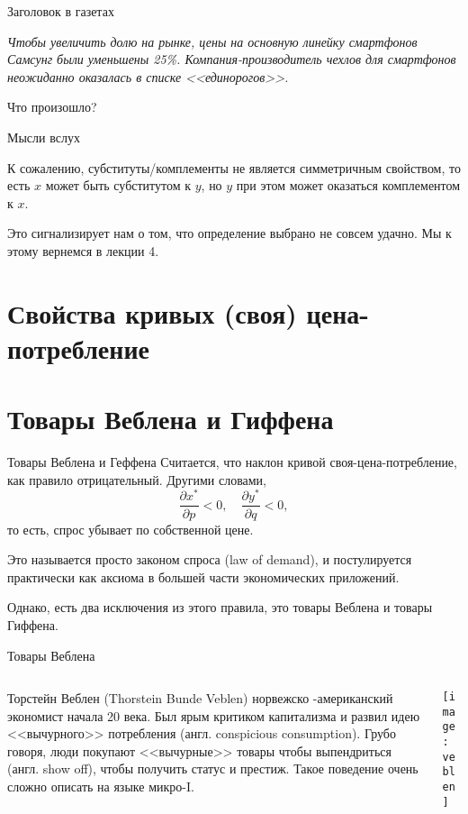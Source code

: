 \documentclass{beamer}
\begin{document}
\begin{frame}{Заголовок в газетах}

\textit{Чтобы увеличить долю на рынке, цены на основную линейку смартфонов Самсунг были уменьшены 25\%. Компания-производитель чехлов для смартфонов неожиданно оказалась в списке <<единорогов>>.}

Что произошло?

\end{frame}

\begin{frame}{Мысли вслух}

К сожалению, субституты/комплементы не является симметричным свойством, то есть $x$ может быть субститутом к $y$, но $y$ при этом может оказаться комплементом к $x$. 

Это сигнализирует нам о том, что определение выбрано не совсем удачно. Мы к этому вернемся в лекции 4.

\end{frame}

\section{Свойства кривых (своя) цена-потребление}
\section{Товары Веблена и Гиффена}

\begin{frame}{Товары Веблена и Геффена}
Считается, что наклон кривой своя-цена-потребление, как правило отрицательный. Другими словами, $$\frac{\partial x^*}{\partial p} <0, \quad \frac{\partial y^*}{\partial q} <0,$$
то есть, спрос убывает по собственной цене. 

Это называется просто \alert{законом спроса} (law of demand), и постулируется практически как аксиома в большей части экономических приложений.

Однако, есть два исключения из этого правила, это \alert{товары Веблена} и \alert{товары Гиффена}.
\end{frame}

\begin{frame}{Товары Веблена}
\begin{columns}
\begin{column}{0.5\textwidth}
   \alert{Торстейн Веблен} (Thorstein Bunde Veblen) норвежско -американский экономист начала 20 века. Был ярым критиком капитализма и развил идею <<вычурного>> потребления (англ. \alert{conspicious consumption}). Грубо говоря, люди покупают <<вычурные>> товары чтобы выпендриться (англ. show off), чтобы получить статус и престиж. \alert{Такое поведение очень сложно описать на языке микро-I.}
\end{column}
\begin{column}{0.5\textwidth}  %
    \begin{center}
     \texttt{[image: veblen]}
     \end{center}
\end{column}
\end{columns}
\end{frame}
\end{document}
